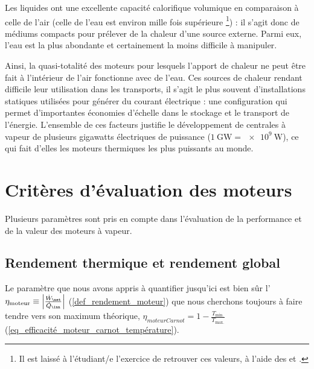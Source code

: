 	Les liquides ont une excellente capacité calorifique volumique en comparaison à celle de l’air (celle de l’eau est environ mille fois supérieure%
		\footnote{Il est laissé à l’étudiant/e l’exercice de retrouver ces valeurs, à l’aide des \coursquatre et \courscinq.}) : il s’agit donc de médiums compacts pour prélever de la chaleur d’une source externe. Parmi eux, l’eau est la plus abondante et certainement la moins difficile à manipuler.

	Ainsi, la quasi-totalité des moteurs pour lesquels l’apport de chaleur ne peut être fait à l’intérieur de l’air fonctionne avec de l’eau. Ces sources de chaleur rendant difficile leur utilisation dans les transports, il s’agit le plus souvent d’installations statiques utilisées pour générer du courant électrique : une configuration qui permet d’importantes économies d’échelle dans le stockage et le transport de l’énergie. L’ensemble de ces facteurs justifie le développement de centrales à vapeur de plusieurs \si{gigawatts} électriques de puissance ($\SI{1}{\giga\watt} = \SI{e9}{\watt}$), ce qui fait d’elles les moteurs thermiques les plus puissants au monde.


\section{Critères d’évaluation des moteurs}
\label{ch_evaluation_moteurs_vapeur}

	Plusieurs paramètres sont pris en compte dans l’évaluation de la performance et de la valeur des moteurs à vapeur.

	\subsection{Rendement thermique et rendement global}

		Le paramètre que nous avons appris à quantifier jusqu’ici est bien sûr l’ $\eta_\text{moteur} \equiv \left| \frac{\dot{W}_\net}{\dot{Q}_\inn} \right|$ (\ref{def_rendement_moteur}) que nous cherchons toujours à faire tendre vers son maximum théorique, $\eta _{moteur Carnot} = 1 - \frac{T_\text{min.}}{T_\text{max.}}$ (\ref{eq_efficacité_moteur_carnot_température}).
		
